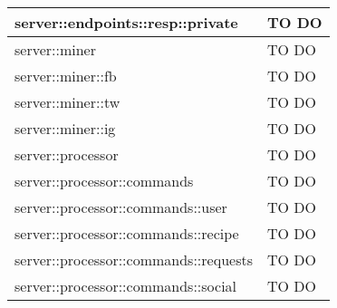 \begin{center}
\begin{longtable}{| p{9cm} | p{4cm} |}
\hline
server::endpoints::resp::private  &  TO DO \\
\hline
server::miner  &  TO DO \\
\hline
server::miner::fb  &  TO DO \\
\hline
server::miner::tw  &  TO DO \\
\hline
server::miner::ig  &  TO DO \\
\hline
server::processor  &  TO DO \\
\hline
server::processor::commands  &  TO DO \\
\hline
server::processor::commands::user  &  TO DO \\
\hline
server::processor::commands::recipe  &  TO DO \\
\hline
server::processor::commands::requests  &  TO DO \\
\hline
server::processor::commands::social  &  TO DO \\
\hline
\end{longtable}
\egroup
\end{center}
